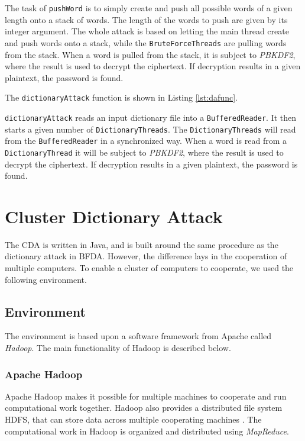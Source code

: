 \documentclass[pdftex,english,10pt,b5paper,twoside]{book}
\begin{document}
The task of \texttt{pushWord} is to simply create and push all possible words
of a given length onto a stack of words. The length of the words to push are
given by its integer argument. The whole attack is based on letting the main
thread create and push words onto a stack, while the \texttt{BruteForceThreads} are
pulling words from the stack. When a word is pulled from the stack, it is
subject to \emph{PBKDF2}, where the result is used to decrypt the ciphertext. If
decryption results in a given plaintext, the password is found.

The \texttt{dictionaryAttack} function is shown in Listing \ref{lst:dafunc}.



\texttt{dictionaryAttack} reads an input dictionary file into a
\texttt{BufferedReader}. It then starts a given number of
\texttt{DictionaryThreads}. The \texttt{DictionaryThreads} will read from the
\texttt{BufferedReader} in a synchronized way. When a word is read from a
\texttt{DictionaryThread} it will be subject to \emph{PBKDF2}, where the result is
used to decrypt the ciphertext. If decryption results in a given plaintext, the
password is found.

\section{Cluster Dictionary Attack}

The \ac{CDA} is written in Java, and is built around the same procedure as the
dictionary attack in \ac{BFDA}. However, the difference lays in the cooperation
of multiple computers. To enable a cluster of computers to cooperate, we used
the following environment.

\subsection{Environment}

The environment is based upon a software framework from Apache called
\emph{Hadoop}. The main functionality of Hadoop is described below.

\subsubsection{Apache Hadoop}

Apache Hadoop makes it possible for multiple machines to cooperate
and run computational work together. Hadoop also provides a distributed file system
\ac{HDFS}, that can store data across multiple cooperating machines \cite{hadoop}. The
computational work in Hadoop is organized and distributed using \emph{MapReduce}.
\end{document}
